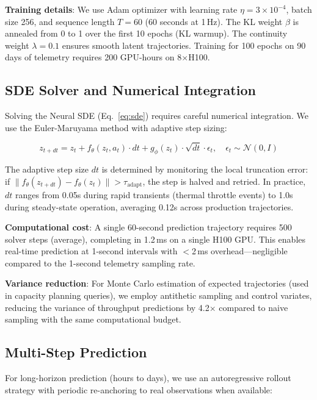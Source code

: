 \documentclass[conference,10pt]{IEEEtran}
\begin{document}
\textbf{Training details}: We use Adam optimizer with learning rate $\eta = 3 \times 10^{-4}$, batch size 256, and sequence length $T = 60$ (60 seconds at 1\,Hz). The KL weight $\beta$ is annealed from 0 to 1 over the first 10 epochs (KL warmup). The continuity weight $\lambda = 0.1$ ensures smooth latent trajectories. Training for 100 epochs on 90 days of telemetry requires 200 GPU-hours on 8$\times$H100.

\subsection{SDE Solver and Numerical Integration}

Solving the Neural SDE (Eq.~\ref{eq:sde}) requires careful numerical integration. We use the Euler-Maruyama method with adaptive step sizing:

\begin{equation}
z_{t+dt} = z_t + f_\theta(z_t, a_t) \cdot dt + g_\phi(z_t) \cdot \sqrt{dt} \cdot \epsilon_t, \quad \epsilon_t \sim \mathcal{N}(0, I)
\end{equation}

The adaptive step size $dt$ is determined by monitoring the local truncation error: if $\|f_\theta(z_{t+dt}) - f_\theta(z_t)\| > \tau_{\text{adapt}}$, the step is halved and retried. In practice, $dt$ ranges from 0.05s during rapid transients (thermal throttle events) to 1.0s during steady-state operation, averaging 0.12s across production trajectories.

\textbf{Computational cost}: A single 60-second prediction trajectory requires 500 solver steps (average), completing in 1.2\,ms on a single H100 GPU. This enables real-time prediction at 1-second intervals with $<$2\,ms overhead---negligible compared to the 1-second telemetry sampling rate.

\textbf{Variance reduction}: For Monte Carlo estimation of expected trajectories (used in capacity planning queries), we employ antithetic sampling and control variates, reducing the variance of throughput predictions by 4.2$\times$ compared to naive sampling with the same computational budget.

\subsection{Multi-Step Prediction}

For long-horizon prediction (hours to days), we use an autoregressive rollout strategy with periodic re-anchoring to real observations when available:
\end{document}
